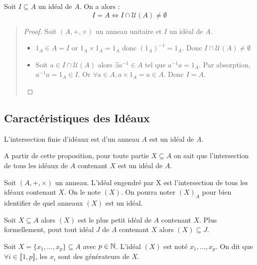\newpage

\begin{theorem}
    Soit $I \subseteq A$ un idéal de $A$. On a alors :
        \[ I = A \iff I \cap \mathcal{U}(A) \not = \emptyset \] 
\end{theorem}

\begin{quote}
\begin{footnotesize}
    \begin{proof}
        Soit $(A,+,\times)$ un anneau unitaire et $I$ un idéal de $A$. 
        \begin{itemize}
            \item[$\boxed{\Rightarrow}$] $1_A \in A = I$ or $1_A \times 1_A = 1_A$ donc $(1_A)^{-1} = 1_A$. Donc $ I \cap \mathcal{U}(A) \not = \emptyset $
            \item[$\boxed{\Rightarrow}$] Soit $a \in I \cap \mathcal{U}(A)$ alors $ \exists a^{-1} \in A$ tel que $a^{-1}a = 1_A$. 
            Par absorption, $a^{-1}a = 1_A \in I$. Or $ \forall a \in A, a \times 1_A = a \in A$. Donc $I = A$. 
        \end{itemize}
    \end{proof}
\end{footnotesize}
\end{quote}

\subsection{Caractéristiques des Idéaux}

\begin{proposition}
    L'intersection finie d'idéaux est d'un anneau $A$ est un idéal de $A$. 
\end{proposition}

A partir de cette proposition, pour toute partie $X \subseteq A$ on sait que l'intersection de tous les idéaux de $A$ contenant 
$X$ est un idéal de $A$. 

\begin{definition}
    Soit $(A,+,\times)$ un anneau. L'idéal engendré par X est l'intersection de tous les idéaux contenant $X$. On le note $(X)$. 
    On pourra noter $(X)_A$ pour bien identifier de quel anneaux $(X)$ est un idéal. 
\end{definition}

\begin{remark}
    Soit $X \subseteq A$ alors $(X)$ est le plus petit idéal de $A$ contenant $X$. Plus formellement, pout tout idéal $J$ de $A$ contenant $X$ 
    alors $(X) \subseteq J$. 

    \vspace{0.3cm}

    Soit $X = \{ x_1, \dots, x_p \} \subseteq A$ avec $p \in \mathbb{N}$. L'idéal $(X)$ est noté $x_1, \dots, x_p$. 
    On dit que $ \forall i \in \llbracket 1, p \rrbracket$, les $x_i$ sont des générateurs de $X$. 
\end{remark}


